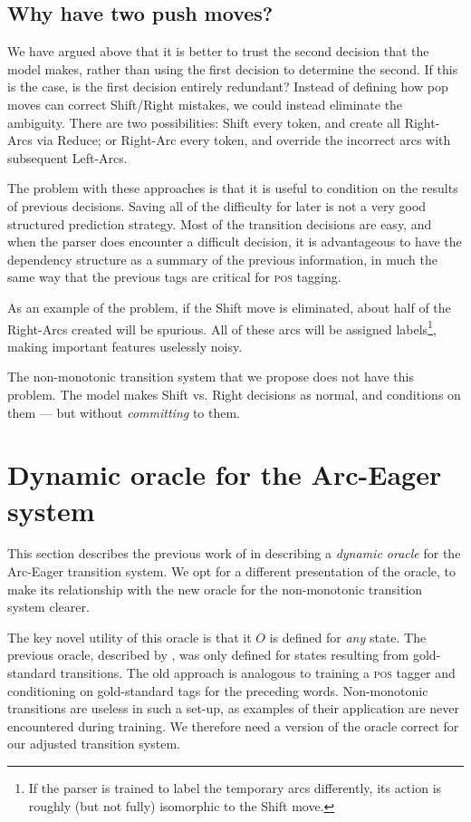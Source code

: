 \documentclass[11pt,letterpaper]{article}
\newcommand{\pos}{\textsc{pos}\xspace}
\begin{document}
\subsection{Why have two push moves?}

We have argued above that it is better to trust the second decision that the model
makes, rather than using the first decision to determine the second. If this is
the case, is the first decision entirely redundant?
Instead of defining how pop moves can correct Shift/Right mistakes, we could
instead eliminate the ambiguity. There are two possibilities:
Shift every token, and create all Right-Arcs via Reduce; or Right-Arc every token,
and override the incorrect arcs with subsequent Left-Arcs.

The problem with these approaches is that it is useful to condition
on the results of previous decisions. Saving all of the difficulty for later
is not a very good structured prediction strategy. Most of the transition decisions are
easy, and when the parser does encounter a difficult decision, it is advantageous
to have the dependency structure as a summary of the previous information, in
much the same way that the previous tags are critical for \pos tagging. 

As an example of the problem, if the Shift move is
eliminated, about half of the Right-Arcs created will be spurious. All of these
arcs will be assigned labels\footnote{If the parser is trained to label the temporary
arcs differently, its action is roughly (but not fully) isomorphic to the Shift move.},
making important features uselessly noisy.

The non-monotonic transition system that we propose does not have this problem.
The model makes Shift vs. Right decisions as normal, and conditions on them --- but
without \emph{committing} to them.


\section{Dynamic oracle for the Arc-Eager system}
\label{ref:oracle}

This section describes the previous work of \citet{goldberg:12} in describing
a \emph{dynamic oracle} for the Arc-Eager transition system.
We opt for a different presentation of the oracle,
to make its relationship with the new oracle for the non-monotonic transition
system clearer.

The key novel utility of this oracle is that it
$O$ is defined for \emph{any} state. The previous oracle, described by 
\citet{nivre:04}, was only defined for states resulting from gold-standard
transitions. The old approach is analogous to training a \pos tagger
and conditioning on gold-standard tags for the preceding words.
Non-monotonic transitions are useless in such a set-up, as examples of their
application are never encountered during training. We therefore need a version
of the oracle correct for our adjusted transition system.
\end{document}
